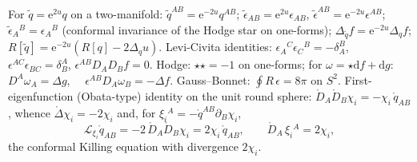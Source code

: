 \documentclass[11pt]{article}
\newcommand{\dd}{\mathrm{d}}
\newcommand{\ee}{\mathrm{e}}
\newcommand{\Lie}{\mathcal{L}}
\newcommand{\qo}{\mathring{q}}          %
\newcommand{\Do}{\mathring{D}}          %
\newcommand{\Lapo}{\mathring{\Delta}}   %
\begin{document}
For $\tilde q = \ee^{2u}q$ on a two-manifold:
$\tilde q^{AB} = \ee^{-2u}q^{AB}$;
$\tilde\epsilon_{AB} = \ee^{2u}\epsilon_{AB}$,
$\tilde\epsilon^{AB} = \ee^{-2u}\epsilon^{AB}$;
$\tilde\epsilon_A{}^B = \epsilon_A{}^B$ (conformal invariance of the Hodge
star on one-forms);
$\Delta_{\tilde q}f = \ee^{-2u}\Delta_q f$;
$R[\tilde q] = \ee^{-2u}(R[q] - 2\Delta_q u)$.
Levi-Civita identities: $\epsilon_A{}^C\epsilon_C{}^B = -\delta_A^B$,
$\epsilon^{AC}\epsilon_{BC} = \delta^A_B$,
$\epsilon^{AB}D_AD_Bf = 0$.
Hodge: $\star\star = -1$ on one-forms;
for $\omega = \star\dd f + \dd g$:\ \
$D^A\omega_A = \Delta g$, \ \
$\epsilon^{AB}D_A\omega_B = -\Delta f$.
Gauss--Bonnet: $\oint R\,\epsilon = 8\pi$ on $S^2$.
First-eigenfunction (Obata-type) identity on the unit round sphere:
$\Do_A\Do_B\chi_i = -\chi_i\,\qo_{AB}$, whence $\Lapo\chi_i = -2\chi_i$ and,
for $\xi_i{}^A = -\qo^{AB}\partial_B\chi_i$,
\begin{equation*}
  \Lie_{\xi_i}\qo_{AB} = -2\,\Do_A\Do_B\chi_i = 2\chi_i\,\qo_{AB},
  \qquad
  \Do_A\,\xi_i{}^A = 2\chi_i ,
\end{equation*}
the conformal Killing equation with divergence $2\chi_i$.
\end{document}
